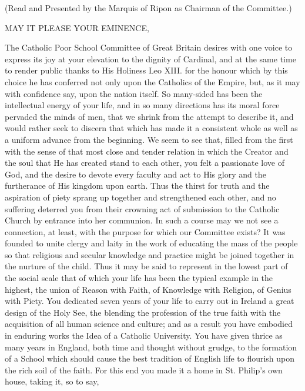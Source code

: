 

(Read and Presented by the Marquis of Ripon as
Chairman of the Committee.)

MAY IT PLEASE
YOUR EMINENCE,

The Catholic Poor School Committee of Great Britain desires with one
voice to express its joy at your elevation to the dignity of Cardinal,
and at the same time to render public thanks to His Holiness Leo XIII.
for the honour which by this choice he has conferred not only upon the
Catholics of the Empire, but, as it may with confidence say, upon the
nation itself. So many-sided has been the intellectual energy of
your life, and in so many directions has its moral force pervaded the
minds of men, that we shrink from the attempt to describe it, and
would rather seek to discern that which has made it a consistent whole
as well as a uniform advance from the beginning. We seem to see that,
filled from the first with the sense of that most close and tender
relation in which the Creator and the soul that He has created stand
to each other, you felt a passionate love of God, and the desire to
devote every faculty and act to His glory and the furtherance of His
kingdom upon earth. Thus the thirst for truth and the aspiration of
piety sprang up together and strengthened each other, and no suffering
deterred you from their crowning act of submission to the Catholic
Church by entrance into her communion. In such a course may we not see
a connection, at least, with the purpose for which our Committee
exists? It was founded to unite clergy and laity in the work of
educating the mass of the people so that religious and secular
knowledge and practice might be joined together in the nurture of the
child. Thus it may be said to represent in the lowest part of the
social scale that of which your life has been the typical example in
the highest, the union of Reason with Faith, of Knowledge with
Religion, of Genius with Piety. You dedicated seven years of your
life to carry out in Ireland a great design of the Holy See, the
blending the profession of the true faith with the acquisition of all
human science and culture; and as a result you have embodied in
enduring works the Idea of a Catholic University. You have given
thrice as many years in England, both time and thought without grudge,
to the formation of a School which should cause the best tradition of
English life to flourish upon the rich soil of the faith. For this end
you made it a home in St. Philip's own house, taking it, so to say,
